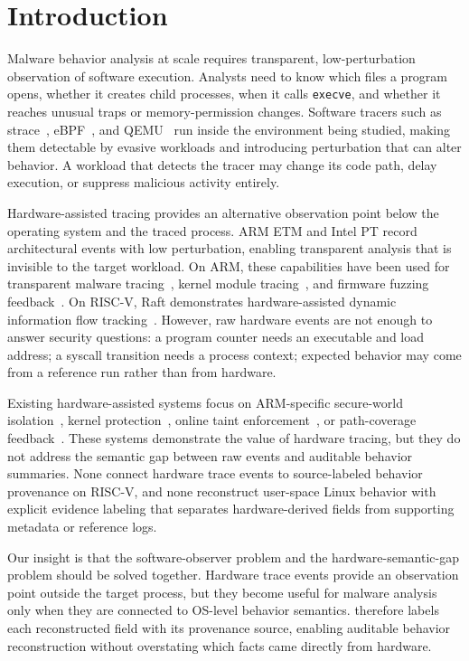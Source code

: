 \section{Introduction}

Malware behavior analysis at scale requires transparent, low-perturbation
observation of software execution. Analysts need to know which files a program
opens, whether it creates child processes, when it calls \texttt{execve}, and
whether it reaches unusual traps or memory-permission changes. Software tracers
such as strace~\cite{strace}, eBPF~\cite{ebpf}, and QEMU~\cite{bellard-qemu} run
inside the environment being studied, making them detectable by evasive workloads
and introducing perturbation that can alter behavior. A workload that detects the
tracer may change its code path, delay execution, or suppress malicious activity
entirely.

Hardware-assisted tracing provides an alternative observation point below the
operating system and the traced process. ARM ETM and Intel PT record
architectural events with low perturbation, enabling transparent analysis that is
invisible to the target workload. On ARM, these capabilities have been used for
transparent malware tracing~\cite{ning2017ninja,ning2019ninja}, kernel module
tracing~\cite{hart2020esorics}, and firmware fuzzing
feedback~\cite{microafl2022icse}. On RISC-V, Raft demonstrates hardware-assisted
dynamic information flow tracking~\cite{raft2023raid}. However, raw hardware
events are not enough to answer security questions: a program counter needs an
executable and load address; a syscall transition needs a process context;
expected behavior may come from a reference run rather than from hardware.

Existing hardware-assisted systems focus on ARM-specific secure-world
isolation~\cite{ning2017ninja,ning2019ninja}, kernel
protection~\cite{hart2020esorics}, online taint
enforcement~\cite{raft2023raid}, or path-coverage
feedback~\cite{microafl2022icse}. These systems demonstrate the value of hardware
tracing, but they do not address the semantic gap between raw events and
auditable behavior summaries. None connect hardware trace events to
source-labeled behavior provenance on RISC-V, and none reconstruct user-space
Linux behavior with explicit evidence labeling that separates hardware-derived
fields from supporting metadata or reference logs.

Our insight is that the software-observer problem and the hardware-semantic-gap
problem should be solved together. Hardware trace events provide an observation
point outside the target process, but they become useful for malware analysis
only when they are connected to OS-level behavior semantics. \rvmt therefore
labels each reconstructed field with its provenance source, enabling auditable
behavior reconstruction without overstating which facts came directly from
hardware.


